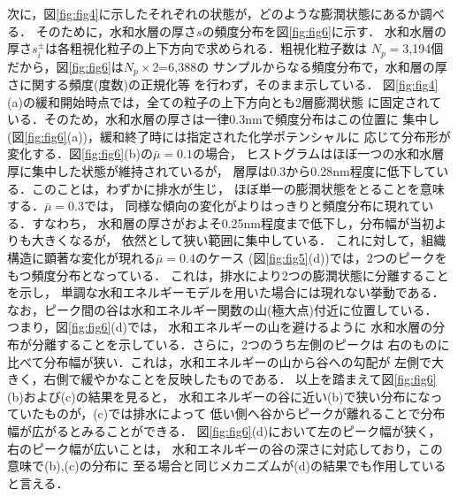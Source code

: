 次に，図\ref{fig:fig4}に示したそれぞれの状態が，どのような膨潤状態にあるか調べる．
そのために，水和水層の厚さ$s$の頻度分布を図\ref{fig:fig6}に示す．
水和水層の厚さ$s_i^\pm$は各粗視化粒子の上下方向で求められる．粗視化粒子数は
$N_p=$3,194個だから，図\ref{fig:fig6}は$N_p\times$2=6,388の
サンプルからなる頻度分布で，水和層の厚さに関する頻度(度数)の正規化等
を行わず，そのまま示している．
図\ref{fig:fig4}(a)の緩和開始時点では，全ての粒子の上下方向とも2層膨潤状態
に固定されている．そのため，水和水層の厚さは一律0.3nmで頻度分布はこの位置に
集中し(図\ref{fig:fig6}(a))，緩和終了時には指定された化学ポテンシャルに
応じて分布形が変化する．図\ref{fig:fig6}(b)の$\bar{\mu}=0.1$の場合，
ヒストグラムはほぼ一つの水和水層厚に集中した状態が維持されているが，
層厚は0.3から0.28nm程度に低下している．このことは，わずかに排水が生じ，
ほぼ単一の膨潤状態をとることを意味する．$\bar{\mu}=0.3$では，
同様な傾向の変化がよりはっきりと頻度分布に現れている．すなわち，
水和層の厚さがおよそ0.25nm程度まで低下し，分布幅が当初よりも大きくなるが，
依然として狭い範囲に集中している．
これに対して，組織構造に顕著な変化が現れる$\bar{\mu}=0.4$のケース
(図\ref{fig:fig5}(d))では，2つのピークをもつ頻度分布となっている．
これは，排水により2つの膨潤状態に分離することを示し，
単調な水和エネルギーモデルを用いた場合には現れない挙動である．
なお，ピーク間の谷は水和エネルギー関数の山(極大点)付近に位置している．
つまり，図\ref{fig:fig6}(d)では， 水和エネルギーの山を避けるように
水和水層の分布が分離することを示している．さらに，2つのうち左側のピークは
右のものに比べて分布幅が狭い．これは，水和エネルギーの山から谷への勾配が
左側で大きく，右側で緩やかなことを反映したものである．
以上を踏まえて図\ref{fig:fig6}(b)および(c)の結果を見ると，
水和エネルギーの谷に近い(b)で狭い分布になっていたものが，(c)では排水によって
低い側へ谷からピークが離れることで分布幅が広がるとみることができる．
図\ref{fig:fig6}(d)において左のピーク幅が狭く，右のピーク幅が広いことは，
水和エネルギーの谷の深さに対応しており，この意味で(b),(c)の分布に
至る場合と同じメカニズムが(d)の結果でも作用していると言える．

